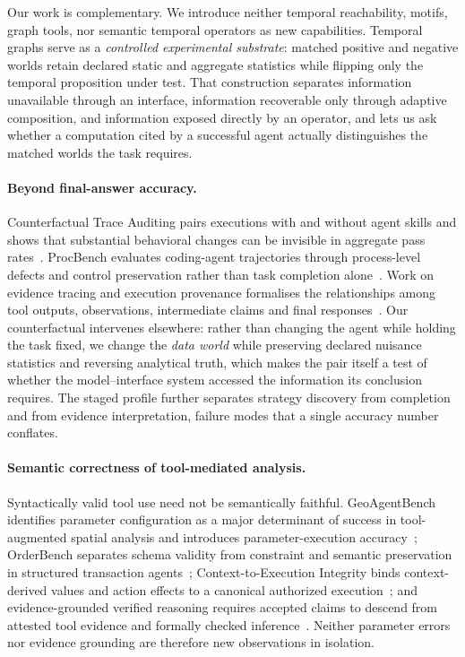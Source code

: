 \documentclass[sigconf,anonymous,review]{acmart}
\begin{document}
Our work is complementary. We introduce neither temporal reachability, motifs, graph tools, nor
semantic temporal operators as new capabilities. Temporal graphs serve as a \emph{controlled
experimental substrate}: matched positive and negative worlds retain declared static and aggregate
statistics while flipping only the temporal proposition under test. That construction separates
information unavailable through an interface, information recoverable only through adaptive
composition, and information exposed directly by an operator, and lets us ask whether a
computation cited by a successful agent actually distinguishes the matched worlds the task
requires.

\paragraph{Beyond final-answer accuracy.}
Counterfactual Trace Auditing pairs executions with and without agent skills and shows that
substantial behavioral changes can be invisible in aggregate pass rates~\cite{cta2026}. ProcBench
evaluates coding-agent trajectories through process-level defects and control preservation rather
than task completion alone~\cite{procbench2026}. Work on evidence tracing and execution provenance
formalises the relationships among tool outputs, observations, intermediate claims and final
responses~\cite{evidenceprovenance2026}. Our counterfactual intervenes elsewhere: rather than
changing the agent while holding the task fixed, we change the \emph{data world} while preserving
declared nuisance statistics and reversing analytical truth, which makes the pair itself a test of
whether the model--interface system accessed the information its conclusion requires. The staged
profile further separates strategy discovery from completion and from evidence interpretation,
failure modes that a single accuracy number conflates.

\paragraph{Semantic correctness of tool-mediated analysis.}
Syntactically valid tool use need not be semantically faithful. GeoAgentBench identifies parameter
configuration as a major determinant of success in tool-augmented spatial analysis and introduces
parameter-execution accuracy~\cite{geoagentbench2026}; OrderBench separates schema validity from
constraint and semantic preservation in structured transaction agents~\cite{orderbench2026};
Context-to-Execution Integrity binds context-derived values and action effects to a canonical
authorized execution~\cite{cxi2026}; and evidence-grounded verified reasoning requires accepted
claims to descend from attested tool evidence and formally checked
inference~\cite{egvar2026}. Neither parameter errors nor evidence grounding are therefore new
observations in isolation.
\end{document}
